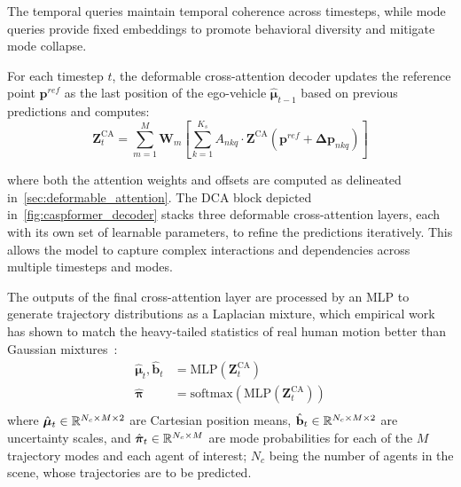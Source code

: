 \begin{description}[leftmargin=1em,itemsep=2pt]
\begin{description}[leftmargin=1em,itemsep=2pt]
The temporal queries maintain temporal coherence across timesteps, while mode queries provide fixed embeddings to promote behavioral diversity and mitigate mode collapse.

For each timestep \(t\), the deformable cross-attention decoder updates the reference point \(\mathbf{p}^{ref}\) as the last position of the ego-vehicle \( \hat{\boldsymbol{\mu}}_{t-1}\) based on previous predictions and computes:
\begin{equation}
\label{eq:cross_attention_operation}
\mathbf{Z}^{\text{CA}}_t = \sum_{m=1}^{M} \mathbf{W}_m \left[ \sum_{k=1}^{K_s} A_{nkq} \cdot \mathbf{Z}^{\text{CA}}(\mathbf{p}^{ref} + \boldsymbol{\Delta p}_{nkq}) \right]
\end{equation}

where both the attention weights and offsets are computed as delineated in~\autoref{sec:deformable_attention}. The DCA block depicted in~\autoref{fig:caspformer_decoder} stacks three deformable cross-attention layers, each with its own set of learnable parameters, to refine the predictions iteratively. This allows the model to capture complex interactions and dependencies across multiple timesteps and modes.

\item[Autoregressive Decoding with Mixture Outputs.] The outputs of the final cross-attention layer are processed by an MLP to generate trajectory distributions as a Laplacian mixture, which empirical work has shown to match the heavy-tailed statistics of real human motion better than Gaussian mixtures~\cite{zhou2022hivt,caspformerYadav2024}:
\begin{equation}
\label{eq:mixture_trajectory_output}
\begin{aligned}
\hat{\boldsymbol{\mu}}_{t}, \hat{\mathbf{b}}_{t} &= \text{MLP}(\mathbf{Z}^{\text{CA}}_t)\\
\hat{\boldsymbol{\pi}} &= \text{softmax}(\text{MLP}(\mathbf{Z}^{\text{CA}}_t)) \\
\end{aligned}
\end{equation}
where \(\hat{\boldsymbol{\mu}}_{t} \in \mathbb{R}^{N_c \times M \times 2}\) are Cartesian position means, \(\hat{\mathbf{b}}_{t} \in \mathbb{R}^{N_c \times M \times 2}\) are uncertainty scales, and \(\hat{\boldsymbol{\pi}}_t \in \mathbb{R}^{N_c \times M}\) are mode probabilities for each of the \(M\) trajectory modes and each agent of interest; \( N_c \) being the number of agents in the scene, whose trajectories are to be predicted.


\end{description}
\end{description}
